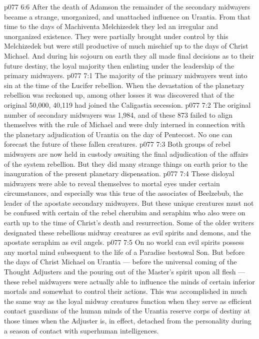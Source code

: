 \vs p077 6:6 After the death of Adamson the remainder of the secondary midwayers became a strange, unorganized, and unattached influence on Urantia. From that time to the days of Machiventa Melchizedek they led an irregular and unorganized existence. They were partially brought under control by this Melchizedek but were still productive of much mischief up to the days of Christ Michael. And during his sojourn on earth they all made final decisions as to their future destiny, the loyal majority then enlisting under the leadership of the primary midwayers.
\vs p077 7:1 The majority of the primary midwayers went into sin at the time of the Lucifer rebellion. When the devastation of the planetary rebellion was reckoned up, among other losses it was discovered that of the original 50,000, 40,119 had joined the Caligastia secession.
\vs p077 7:2 The original number of secondary midwayers was 1,984, and of these 873 failed to align themselves with the rule of Michael and were duly interned in connection with the planetary adjudication of Urantia on the day of Pentecost. No one can forecast the future of these fallen creatures.
\vs p077 7:3 Both groups of rebel midwayers are now held in custody awaiting the final adjudication of the affairs of the system rebellion. But they did many strange things on earth prior to the inauguration of the present planetary dispensation.
\vs p077 7:4 These disloyal midwayers were able to reveal themselves to mortal eyes under certain circumstances, and especially was this true of the associates of Beelzebub, the leader of the apostate secondary midwayers. But these unique creatures must not be confused with certain of the rebel cherubim and seraphim who also were on earth up to the time of Christ’s death and resurrection. Some of the older writers designated these rebellious midway creatures as evil spirits and demons, and the apostate seraphim as evil angels.
\vs p077 7:5 On no world can evil spirits possess any mortal mind subsequent to the life of a Paradise bestowal Son. But before the days of Christ Michael on Urantia --- before the universal coming of the Thought Adjusters and the pouring out of the Master’s spirit upon all flesh --- these rebel midwayers were actually able to influence the minds of certain inferior mortals and somewhat to control their actions. This was accomplished in much the same way as the loyal midway creatures function when they serve as efficient contact guardians of the human minds of the Urantia reserve corps of destiny at those times when the Adjuster is, in effect, detached from the personality during a season of contact with superhuman intelligences.
